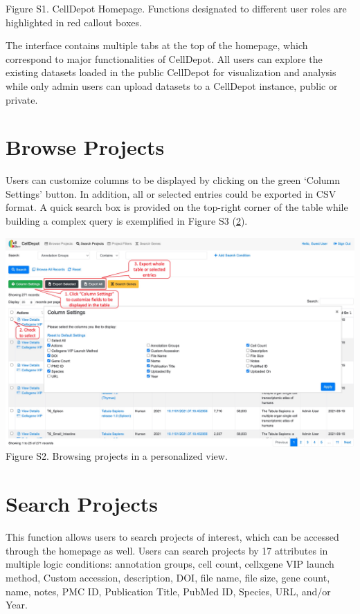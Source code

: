 \documentclass[
  openany]{book}
\begin{document}
Figure S1. CellDepot Homepage. Functions designated to different user roles are highlighted in red callout boxes.

The interface contains multiple tabs at the top of the homepage, which correspond to major functionalities of CellDepot. All users can explore the existing datasets loaded in the public CellDepot for visualization and analysis while only admin users can upload datasets to a CellDepot instance, public or private.

\hypertarget{browse-projects}{%
\section{Browse Projects}\label{browse-projects}}

Users can customize columns to be displayed by clicking on the green `Column Settings' button. In addition, all or selected entries could be exported in CSV format. A quick search box is provided on the top-right corner of the table while building a complex query is exemplified in Figure S3 (\ref{search}).

\href{figures/S2.jpg}{\includegraphics{figures/S2.jpg}}
Figure S2. Browsing projects in a personalized view.

\hypertarget{search}{%
\section{Search Projects}\label{search}}

This function allows users to search projects of interest, which can be accessed through the homepage as well. Users can search projects by 17 attributes in multiple logic conditions: annotation groups, cell count, cellxgene VIP launch method, Custom accession, description, DOI, file name, file size, gene count, name, notes, PMC ID, Publication Title, PubMed ID, Species, URL, and/or Year.
\end{document}
